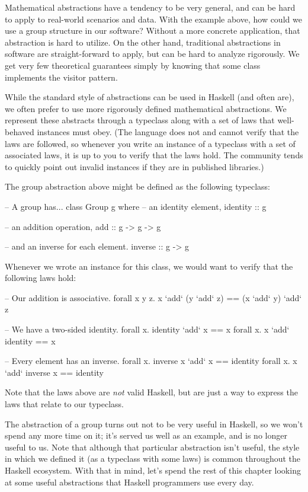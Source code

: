 Mathematical abstractions have a tendency to be very general, and can be hard to apply to real-world
scenarios and data. With the example above, how could we use a group structure in our software?
Without a more concrete application, that abstraction is hard to utilize. On the other hand,
traditional abstractions in software are straight-forward to apply, but can be hard to analyze
rigorously. We get very few theoretical guarantees simply by knowing that some class implements the
visitor pattern.

While the standard style of abstractions can be used in Haskell (and often are), we often prefer to
use more rigorously defined mathematical abstractions. We represent these abstracts through a
typeclass along with a set of laws that well-behaved instances must obey. (The language does not
and cannot verify that the laws are followed, so whenever you write an instance of a typeclass
with a set of associated laws, it is up to you to verify that the laws hold. The community tends to
quickly point out invalid instances if they are in published libraries.)

The group abstraction above might be defined as the following typeclass:
\begin{haskell}
-- A group has...
class Group g where
  -- an identity element,
  identity :: g

  -- an addition operation,
  add :: g -> g -> g

  -- and an inverse for each element.
  inverse :: g -> g
\end{haskell}

Whenever we wrote an instance for this class, we would want to verify that the following laws hold:
\begin{haskell}
-- Our addition is associative.
forall x y z. x `add` (y `add` z) == (x `add` y) `add` z

-- We have a two-sided identity.
forall x. identity `add` x == x
forall x. x `add` identity == x

-- Every element has an inverse.
forall x. inverse x `add` x == identity
forall x. x `add` inverse x == identity
\end{haskell}
Note that the laws above are \emph{not} valid Haskell, but are just a way to express the laws that
relate to our  typeclass.

The abstraction of a group turns out not to be very useful in Haskell, so we won't spend any more
time on it; it's served us well as an example, and is no longer useful to us. Note that although
that particular abstraction isn't useful, the style in which we defined it (as a typeclass with some
laws) is common throughout the Haskell ecosystem. With that in mind, let's spend the rest of this
chapter looking at some useful abstractions that Haskell programmers use every day.

